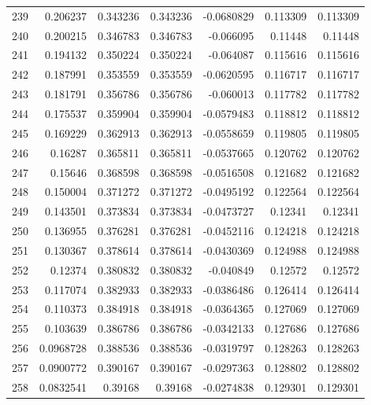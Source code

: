 \begin{tabular}{rrrrrrr}
 239 &  0.206237    & 0.343236    & 0.343236    & -0.0680829   & 0.113309    & 0.113309    \\
 240 &  0.200215    & 0.346783    & 0.346783    & -0.066095    & 0.11448     & 0.11448     \\
 241 &  0.194132    & 0.350224    & 0.350224    & -0.064087    & 0.115616    & 0.115616    \\
 242 &  0.187991    & 0.353559    & 0.353559    & -0.0620595   & 0.116717    & 0.116717    \\
 243 &  0.181791    & 0.356786    & 0.356786    & -0.060013    & 0.117782    & 0.117782    \\
 244 &  0.175537    & 0.359904    & 0.359904    & -0.0579483   & 0.118812    & 0.118812    \\
 245 &  0.169229    & 0.362913    & 0.362913    & -0.0558659   & 0.119805    & 0.119805    \\
 246 &  0.16287     & 0.365811    & 0.365811    & -0.0537665   & 0.120762    & 0.120762    \\
 247 &  0.15646     & 0.368598    & 0.368598    & -0.0516508   & 0.121682    & 0.121682    \\
 248 &  0.150004    & 0.371272    & 0.371272    & -0.0495192   & 0.122564    & 0.122564    \\
 249 &  0.143501    & 0.373834    & 0.373834    & -0.0473727   & 0.12341     & 0.12341     \\
 250 &  0.136955    & 0.376281    & 0.376281    & -0.0452116   & 0.124218    & 0.124218    \\
 251 &  0.130367    & 0.378614    & 0.378614    & -0.0430369   & 0.124988    & 0.124988    \\
 252 &  0.12374     & 0.380832    & 0.380832    & -0.040849    & 0.12572     & 0.12572     \\
 253 &  0.117074    & 0.382933    & 0.382933    & -0.0386486   & 0.126414    & 0.126414    \\
 254 &  0.110373    & 0.384918    & 0.384918    & -0.0364365   & 0.127069    & 0.127069    \\
 255 &  0.103639    & 0.386786    & 0.386786    & -0.0342133   & 0.127686    & 0.127686    \\
 256 &  0.0968728   & 0.388536    & 0.388536    & -0.0319797   & 0.128263    & 0.128263    \\
 257 &  0.0900772   & 0.390167    & 0.390167    & -0.0297363   & 0.128802    & 0.128802    \\
 258 &  0.0832541   & 0.39168     & 0.39168     & -0.0274838   & 0.129301    & 0.129301    \\

\end{tabular}
